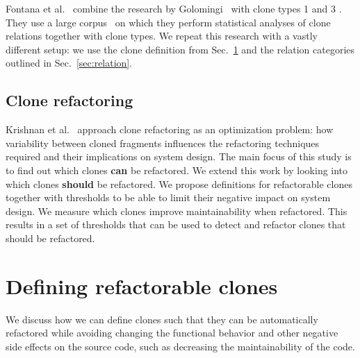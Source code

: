 \documentclass[a4paper,UKenglish,cleveref, autoref, thm-restate,authorcolumns]{lipics-v2019}
\begin{document}
Fontana et al.~\cite{fontana2012duplicated, fontana2015duplicated} combine the research by Golomingi~\cite{koni2001scenario} with clone types 1 and 3 \cite{roy2007survey}. They use a large corpus~\cite{tempero2010qualitas} on which they perform statistical analyses of clone relations together with clone types. We repeat this research with a vastly different setup: we use the clone definition from Sec.~\ref{sec:research} and the relation categories outlined in Sec.~\ref{sec:relation}.

\subsection{Clone refactoring}
Krishnan et al.~\cite{krishnan2013refactoring} approach clone refactoring as an optimization problem: how variability between cloned fragments influences the refactoring techniques required and their implications on system design. The main focus of this study is to find out which clones \textbf{can} be refactored. We extend this work by looking into which clones \textbf{should} be refactored. We propose definitions for refactorable clones together with thresholds to be able to limit their negative impact on system design. We measure which clones improve maintainability when refactored. This results in a set of thresholds that can be used to detect and refactor clones that should be refactored.


\section{Defining refactorable clones}\label{sec:research}
We discuss how we can define clones such that they can be automatically refactored while avoiding changing the functional behavior and other negative side effects on the source code, such as decreasing the maintainability of the code.
\end{document}
